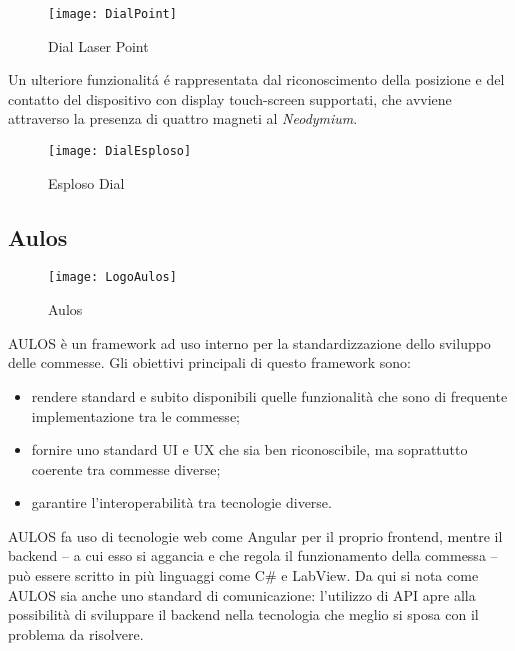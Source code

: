 \begin{figure}[htpb!]
\center
  \texttt{[image: DialPoint]}
  \caption{Dial Laser Point}
\end{figure}

Un ulteriore funzionalitá é rappresentata dal riconoscimento della posizione e del contatto del dispositivo con display touch-screen supportati, che avviene attraverso la presenza di quattro magneti al \emph{Neodymium}. 

\begin{figure}[htpb!]
\center
  \texttt{[image: DialEsploso]}
  \caption{Esploso Dial}
\end{figure}

\subsection{Aulos}
\begin{figure}[htpb!]
\center
  \texttt{[image: LogoAulos]}
  \caption{Aulos}
\end{figure}
AULOS è un framework ad uso interno per la standardizzazione dello sviluppo delle commesse.
Gli obiettivi principali di questo framework sono:
\begin{itemize}
\item rendere standard e subito disponibili quelle funzionalità che sono di frequente implementazione tra le commesse;
\item fornire uno standard UI e UX che sia ben riconoscibile, ma soprattutto coerente tra commesse diverse;
\item garantire l’interoperabilità tra tecnologie diverse.
\end{itemize}

AULOS fa uso di tecnologie web come Angular per il proprio frontend, mentre il backend – a cui esso si aggancia e che regola il funzionamento della commessa – può essere scritto in più linguaggi come C\# e LabView.
Da qui si nota come AULOS sia anche uno standard di comunicazione: l’utilizzo di API apre alla possibilità di sviluppare il backend nella tecnologia che meglio si sposa con il problema da risolvere.
